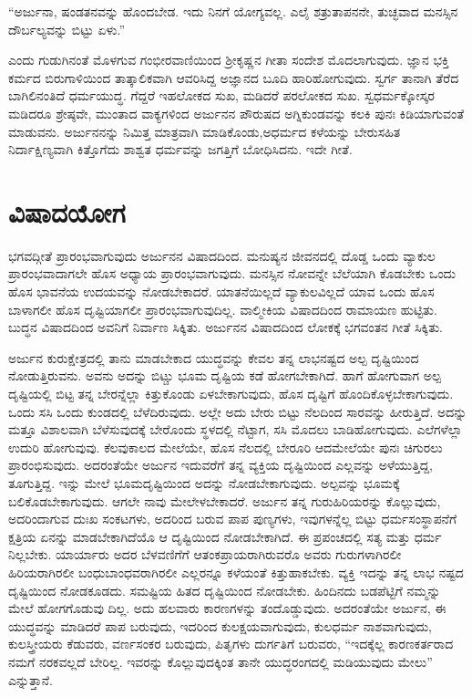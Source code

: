 “ಅರ್ಜುನಾ, ಷಂಡತನವನ್ನು ಹೊಂದಬೇಡ. ಇದು ನಿನಗೆ ಯೋಗ್ಯವಲ್ಲ. ಎಲೈ ಶತ್ರು\-ತಾಪನನೇ, ತುಚ್ಛವಾದ ಮನಸ್ಸಿನ ದೌರ್ಬಲ್ಯವನ್ನು ಬಿಟ್ಟು ಏಳು.”

ಎಂದು ಗುಡುಗಿನಂತೆ ಮೊಳಗುವ ಗಂಭೀರವಾಣಿಯಿಂದ ಶ‍್ರೀಕೃಷ್ಣನ ಗೀತಾ ಸಂದೇಶ ಮೊದಲಾಗುವುದು. ಜ್ಞಾನ ಭಕ್ತಿ ಕರ್ಮದ ಬಿರುಗಾಳಿಯಿಂದ ತಾತ್ಕಾಲಿಕವಾಗಿ ಆವರಿಸಿದ್ದ ಅಜ್ಞಾನದ ಬೂದಿ ಹಾರಿಹೋಗುವುದು. ಸ್ವರ್ಗ ತಾನಾಗಿ ತೆರೆದ ಬಾಗಿಲಿನಂತಿದೆ ಧರ್ಮಯುದ್ಧ. ಗೆದ್ದರೆ ಇಹಲೋಕದ ಸುಖ, ಮಡಿದರೆ ಪರಲೋಕದ ಸುಖ. ಸ್ವಧರ್ಮಕ್ಕೋಸ್ಕರ ಮಡಿದರೂ ಶ್ರೇಷ್ಠವೇ, ಮುಂತಾದ ವಾಕ್ಯಗಳಿಂದ ಅರ್ಜುನನ ಪೌರುಷದ ಅಗ್ನಿಕುಂಡವನ್ನು ಕಲಕಿ ಪುನಃ ಕಿಡಿಯಾಗುವಂತೆ ಮಾಡುವನು. ಅರ್ಜುನನನ್ನು ನಿಮಿತ್ತ ಮಾತ್ರವಾಗಿ ಮಾಡಿಕೊಂಡು,\break ಅಧರ್ಮದ ಕಳೆಯನ್ನು ಬೇರುಸಹಿತ ನಿರ್ದಾಕ್ಷಿಣ್ಯವಾಗಿ ಕಿತ್ತೊಗೆದು ಶಾಶ್ವತ ಧರ್ಮವನ್ನು ಜಗತ್ತಿಗೆ ಬೋಧಿಸಿದನು. ಇದೇ ಗೀತೆ.


\section*{ವಿಷಾದಯೋಗ}

\vskip -8pt

ಭಗವದ್ಗೀತೆ ಪ್ರಾರಂಭವಾಗುವುದು ಅರ್ಜುನನ ವಿಷಾದದಿಂದ. ಮನುಷ್ಯನ ಜೀವನದಲ್ಲಿ ದೊಡ್ಡ ಒಂದು ವ್ಯಾಕುಲ ಪ್ರಾರಂಭವಾದಾಗಲೇ ಹೊಸ ಅಧ್ಯಾಯ ಪ್ರಾರಂಭವಾಗುವುದು. ಮನಸ್ಸಿನ ನೋವನ್ನೇ ಬೆಲೆಯಾಗಿ ಕೊಡಬೇಕು ಒಂದು ಹೊಸ ಭಾವನೆಯ ಉದಯವನ್ನು ನೋಡಬೇಕಾದರೆ. ಯಾತನೆಯಿಲ್ಲದೆ ವ್ಯಾಕುಲವಿಲ್ಲದೆ ಯಾವ ಒಂದು ಹೊಸ ಬಾಳಾಗಲೀ ಹೊಸ ದೃಷ್ಟಿಯಾಗಲೀ ಪ್ರಾರಂಭವಾಗುವುದಿಲ್ಲ. ವಾಲ್ಮೀಕಿಯ ವಿಷಾದದಿಂದ ರಾಮಾಯಣ ಹುಟ್ಟಿತು. ಬುದ್ಧನ ವಿಷಾದದಿಂದ ಅವನಿಗೆ ನಿರ್ವಾಣ ಸಿಕ್ಕಿತು. ಅರ್ಜುನನ ವಿಷಾದದಿಂದ ಲೋಕಕ್ಕೆ ಭಗವಂತನ ಗೀತೆ ಸಿಕ್ಕಿತು.

ಅರ್ಜುನ ಕುರುಕ್ಷೇತ್ರದಲ್ಲಿ ತಾನು ಮಾಡಬೇಕಾದ ಯುದ್ಧವನ್ನು ಕೇವಲ ತನ್ನ ಲಾಭನಷ್ಟದ ಅಲ್ಪ ದೃಷ್ಟಿಯಿಂದ ನೋಡುತ್ತಿರುವನು. ಅವನು ಅದನ್ನು ಬಿಟ್ಚು ಭೂಮ ದೃಷ್ಟಿಯ ಕಡೆ ಹೋಗಬೇಕಾಗಿದೆ. ಹಾಗೆ ಹೋಗುವಾಗ ಅಲ್ಪ ದೃಷ್ಟಿಯಲ್ಲಿ ಬಿಟ್ಟ ತನ್ನ ಬೇರನ್ನೆಲ್ಲಾ ಕಿತ್ತುಕೊಂಡು ಏಳಬೇಕಾಗುವುದು, ಹೊಸ ದೃಷ್ಟಿಗೆ ಹೊಂದಿಕೊಳ್ಳಬೇಕಾಗುವುದು. ಒಂದು ಸಸಿ ಒಂದು ಕುಂಡದಲ್ಲಿ ಬೆಳೆದಿರುವುದು. ಅಲ್ಲೇ ಅದು ಬೇರು ಬಿಟ್ಟು ನೆಲದಿಂದ ಸಾರವನ್ನು ಹೀರುತ್ತಿದೆ. ಅದನ್ನು ಮತ್ತೂ ವಿಶಾಲವಾಗಿ ಬೆಳೆಸುವುದಕ್ಕೆ ಬೇರೊಂದು ಸ್ಥಳದಲ್ಲಿ ನೆಟ್ಟಾಗ, ಸಸಿ ಮೊದಲು ಬಾಡಿಹೋಗುವುದು. ಎಲೆಗಳೆಲ್ಲಾ ಉದುರಿ ಹೋಗುವುವು. ಕೆಲವುಕಾಲದ ಮೇಲೆಯೇ, ಹೊಸ ನೆಲದಲ್ಲಿ ಬೇರೂರಿ ಆದಮೇಲೆಯೇ ಪುನಃ ಚಿಗುರಲು ಪ್ರಾರಂಭಿಸುವುದು. ಅದರಂತೆಯೇ ಅರ್ಜುನ ಇದುವರೆಗೆ ತನ್ನ ವ್ಯಕ್ತಿಯ ದೃಷ್ಟಿಯಿಂದ ಎಲ್ಲವನ್ನು ಅಳೆಯುತ್ತಿದ್ದ, ತೂಗುತ್ತಿದ್ದ. ಇನ್ನು ಮೇಲೆ ಭೂಮದೃಷ್ಟಿಯಿಂದ ಅದನ್ನು ನೋಡಬೇಕಾಗುವುದು. ಅಲ್ಪವನ್ನು ಭೂಮಕ್ಕೆ ಬಲಿಕೊಡಬೇಕಾಗುವುದು. ಆಗಲೇ ನಾವು ಮೇಲೇಳಬೇಕಾದರೆ. ಅರ್ಜುನ ತನ್ನ ಗುರುಹಿರಿಯರನ್ನು ಕೊಲ್ಲುವುದು, ಅದರಿಂದಾಗುವ ದುಃಖ ಸಂಕಟಗಳು, ಅದರಿಂದ ಬರುವ ಪಾಪ ಪುಣ್ಯಗಳು, ಇವುಗಳನ್ನೆಲ್ಲ ಬಿಟ್ಟು ಧರ್ಮಸಂಸ್ಥಾಪನೆಗೆ ಕ್ಷತ್ರಿಯ ಏನನ್ನು ಮಾಡಬೇಕಾಗಿದೆಯೊ ಆ ದೃಷ್ಟಿಯಿಂದ ನೋಡಬೇಕಾಗಿದೆ. ಈ ಪ್ರಪಂಚದಲ್ಲಿ ಸತ್ಯ ಮತ್ತು ಧರ್ಮ ನಿಲ್ಲಬೇಕು. ಯಾರ್ಯಾರು ಅದರ ಬೆಳವಣಿಗೆಗೆ ಆತಂಕಪ್ರಾಯರಾಗಿರುವರೊ ಅವರು ಗುರುಗಳಾಗಿರಲೀ ಹಿರಿಯರಾಗಿರಲೀ ಬಂಧುಬಾಂಧವರಾಗಿರಲೀ ಎಲ್ಲರನ್ನೂ ಕಳೆಯಂತೆ ಕಿತ್ತುಹಾಕಬೇಕು. ವ್ಯಕ್ತಿ ಇದನ್ನು ತನ್ನ ಲಾಭ ನಷ್ಟದ ದೃಷ್ಟಿಯಿಂದ ನೋಡಕೂಡದು. ಸಮಷ್ಟಿಯ ಹಿತದ ದೃಷ್ಟಿಯಿಂದ ನೋಡಬೇಕು. ಹಿಂದಿನದು ಬಡಪೆಟ್ಟಿಗೆ ನಮ್ಮನ್ನು ಮೇಲೆ ಹೋಗಗೊಡುವು ದಿಲ್ಲ. ಅದು ಹಲವಾರು ಕಾರಣಗಳನ್ನು ತಂದೊಡ್ಡುವುದು. ಅದರಂತೆಯೇ ಅರ್ಜುನ, ಈ ಯುದ್ಧವನ್ನು ಮಾಡಿದರೆ ಪಾಪ ಬರುವುದು, ಇದರಿಂದ ಕುಲಕ್ಷಯವಾಗುವುದು, ಕುಲಧರ್ಮ ನಾಶವಾಗುವುದು, ಕುಲಸ್ತ್ರೀಯರು ಕೆಡುವರು, ವರ್ಣಸಂಕರ ಬರುವುದು, ಪಿತೃಗಳು ದುರ್ಗತಿಗೆ ಬರುವರು, “ಇದಕ್ಕೆಲ್ಲ ಕಾರಣಕರ್ತರಾದ ನಮಗೆ ನರಕವಲ್ಲದೆ ಬೇರಿಲ್ಲ. ಇವರನ್ನು ಕೊಲ್ಲುವುದಕ್ಕಿಂತ ತಾನೇ ಯುದ್ಧರಂಗದಲ್ಲಿ ಮಡಿಯುವುದು ಮೇಲು” ಎನ್ನುತ್ತಾನೆ.

